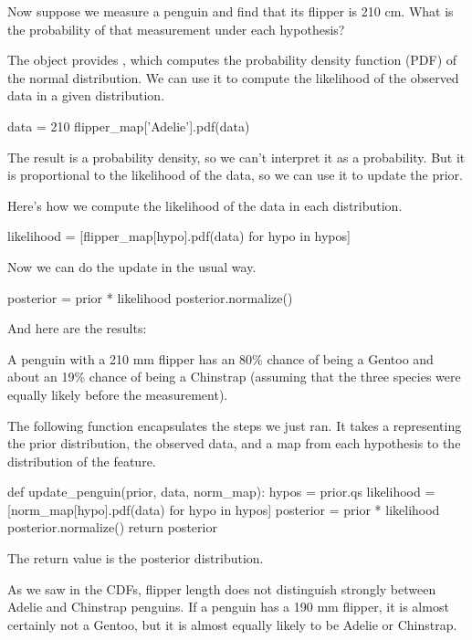 \documentclass[12pt]{book}
\theoremstyle{exercise}
\begin{document}
Now suppose we measure a penguin and find that its flipper is 210 cm.
What is the probability of that measurement under each hypothesis?

The  object provides
, which computes the probability density
function (PDF) of the normal distribution. We can use it to compute the
likelihood of the observed data in a given distribution.

\begin{code}
data = 210
flipper_map['Adelie'].pdf(data)
\end{code}

The result is a probability density, so we can't interpret it as a
probability. But it is proportional to the likelihood of the data, so we
can use it to update the prior.

Here's how we compute the likelihood of the data in each distribution.

\begin{code}
likelihood = [flipper_map[hypo].pdf(data) for hypo in hypos]
\end{code}

Now we can do the update in the usual way.

\begin{code}
posterior = prior * likelihood
posterior.normalize()
\end{code}

And here are the results:



A penguin with a 210 mm flipper has an 80\% chance of being a Gentoo and
about an 19\% chance of being a Chinstrap (assuming that the three
species were equally likely before the measurement).

The following function encapsulates the steps we just ran. It takes a
 representing the prior distribution, the
observed data, and a map from each hypothesis to the distribution of the
feature.

\begin{code}
def update_penguin(prior, data, norm_map):
    hypos = prior.qs
    likelihood = [norm_map[hypo].pdf(data) for hypo in hypos]
    posterior = prior * likelihood
    posterior.normalize()
    return posterior
\end{code}

The return value is the posterior distribution.

As we saw in the CDFs, flipper length does not distinguish strongly
between Adelie and Chinstrap penguins. If a penguin has a 190 mm
flipper, it is almost certainly not a Gentoo, but it is almost equally
likely to be Adelie or Chinstrap.
\end{document}
